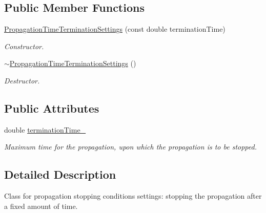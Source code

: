 \subsection*{Public Member Functions}
\begin{DoxyCompactItemize}
\item 
\hyperlink{classtudat_1_1propagators_1_1PropagationTimeTerminationSettings_a95ce20a4274834deb7fc8f5b0eddc3b8}{Propagation\+Time\+Termination\+Settings} (const double termination\+Time)
\begin{DoxyCompactList}\small\item\em Constructor. \end{DoxyCompactList}\item 
\hyperlink{classtudat_1_1propagators_1_1PropagationTimeTerminationSettings_a2f074f51ab17a053adc5b8a6f0252f22}{$\sim$\+Propagation\+Time\+Termination\+Settings} ()\hypertarget{classtudat_1_1propagators_1_1PropagationTimeTerminationSettings_a2f074f51ab17a053adc5b8a6f0252f22}{}\label{classtudat_1_1propagators_1_1PropagationTimeTerminationSettings_a2f074f51ab17a053adc5b8a6f0252f22}

\begin{DoxyCompactList}\small\item\em Destructor. \end{DoxyCompactList}\end{DoxyCompactItemize}
\subsection*{Public Attributes}
\begin{DoxyCompactItemize}
\item 
double \hyperlink{classtudat_1_1propagators_1_1PropagationTimeTerminationSettings_ad457b83b386ac442a1db07cc6e79947d}{termination\+Time\+\_\+}\hypertarget{classtudat_1_1propagators_1_1PropagationTimeTerminationSettings_ad457b83b386ac442a1db07cc6e79947d}{}\label{classtudat_1_1propagators_1_1PropagationTimeTerminationSettings_ad457b83b386ac442a1db07cc6e79947d}

\begin{DoxyCompactList}\small\item\em Maximum time for the propagation, upon which the propagation is to be stopped. \end{DoxyCompactList}\end{DoxyCompactItemize}


\subsection{Detailed Description}
Class for propagation stopping conditions settings\+: stopping the propagation after a fixed amount of time. 

